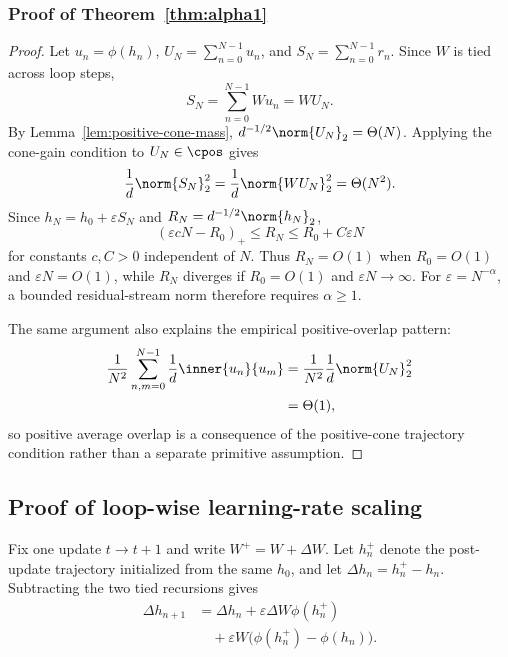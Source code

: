\subsubsection{Proof of Theorem~\ref{thm:alpha1}}

\begin{proof}
Let $u_n=\phi(h_n)$, $U_N=\sum_{n=0}^{N-1}u_n$, and $S_N=\sum_{n=0}^{N-1}r_n$. Since $W$ is tied across loop steps,
\begin{equation}
  S_N
  =
  \sum_{n=0}^{N-1}W u_n
  =
  WU_N.
  \label{eq:app-tied-factorization}
\end{equation}
By Lemma~\ref{lem:positive-cone-mass}, $d^{-1/2}\norm{U_N}_2=\Theta(N)$. Applying the cone-gain condition to $U_N\in\cpos$ gives
\[
  \frac{1}{d}\norm{S_N}_2^2
  =
  \frac{1}{d}\norm{WU_N}_2^2
  =
  \Theta(N^2).
\]
Since $h_N=h_0+\varepsilon S_N$ and $R_N=d^{-1/2}\norm{h_N}_2$,
\[
  \left(\varepsilon cN-R_0\right)_+
  \le
  R_N
  \le
  R_0+C\varepsilon N
\]
for constants $c,C>0$ independent of $N$. Thus $R_N=O(1)$ when $R_0=O(1)$ and $\varepsilon N=O(1)$, while $R_N$ diverges if $R_0=O(1)$ and $\varepsilon N\to\infty$. For $\varepsilon=N^{-\alpha}$, a bounded residual-stream norm therefore requires $\alpha\ge1$.

The same argument also explains the empirical positive-overlap pattern:
\[
  \begin{aligned}
  \frac{1}{N^2}\sum_{n,m=0}^{N-1}
  \frac{1}{d}\inner{u_n}{u_m}
  &=
  \frac{1}{N^2}\frac{1}{d}\norm{U_N}_2^2\\
  &=
  \Theta(1),
  \end{aligned}
\]
so positive average overlap is a consequence of the positive-cone trajectory condition rather than a separate primitive assumption.
\end{proof}

\subsection{Proof of loop-wise learning-rate scaling}
\label{app:lr}

Fix one update $t\to t+1$ and write $W^+=W+\Delta W$. Let $h_n^+$ denote the post-update trajectory initialized from the same $h_0$, and let $\Delta h_n=h_n^+-h_n$. Subtracting the two tied recursions gives
\begin{equation}
  \begin{aligned}
  \Delta h_{n+1}
  &=
  \Delta h_n
  +\varepsilon\Delta W\phi(h_n^+)\\
  &\quad
  +\varepsilon W\bigl(\phi(h_n^+)-\phi(h_n)\bigr).
  \end{aligned}
  \label{eq:app-delta-rec}
\end{equation}

